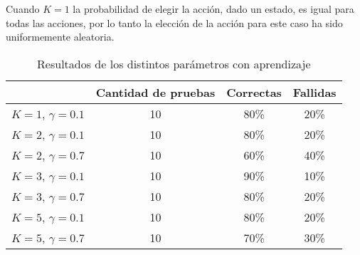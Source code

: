 Cuando $K = 1$ la probabilidad de elegir la acci\'on, dado un estado, es igual para todas las acciones, por lo tanto la elección de la acción para este caso ha sido uniformemente aleatoria.

\begin{table}
\centering
\begin{tabular}{c c c c}
\hline 
& Cantidad de pruebas & Correctas & Fallidas \\ 
\hline 
$K = 1$, $\gamma = 0.1$ & 10 & 80\% & 20\% \\ 
$K = 2$, $\gamma = 0.1$ & 10 & 80\% & 20\% \\ 
$K = 2$, $\gamma = 0.7$ & 10 & 60\% & 40\% \\ 
$K = 3$, $\gamma = 0.1$ & 10 & 90\% & 10\% \\ 
$K = 3$, $\gamma = 0.7$ & 10 & 80\% & 20\% \\ 
$K = 5$, $\gamma = 0.1$ & 10 & 80\% & 20\% \\ 
$K = 5$, $\gamma = 0.7$ & 10 & 70\% & 30\% \\ 
\hline 

\end{tabular} 

\caption{Resultados de los distintos par\'ametros con aprendizaje}
\label{tabla:entramientos}


\end{table}
%
%
%
